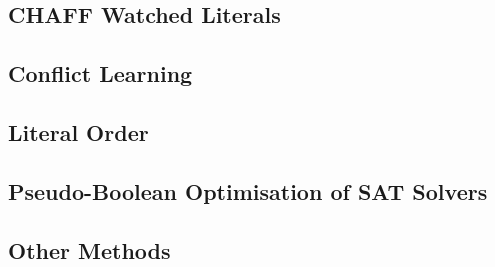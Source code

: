 
\subsection{CHAFF Watched Literals}

\subsection{Conflict Learning}



\subsection{Literal Order}


\subsection{Pseudo-Boolean Optimisation of SAT Solvers}



\subsection{Other Methods}
